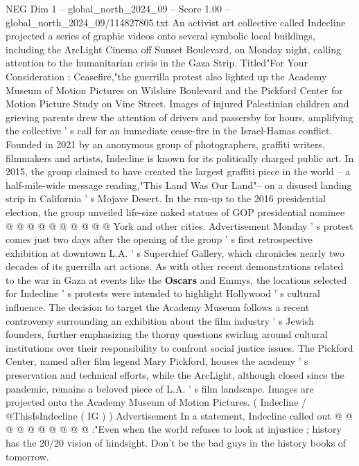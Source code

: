 \begin{textsample}{NEG Dim 1 – global\_north\_2024\_09 – Score 1.00 – global\_north\_2024\_09/114827805.txt}  \label{ex:f1_neg_360}
An activist art collective called Indecline projected a series of graphic videos onto several symbolic local buildings, including the ArcLight Cinema off Sunset Boulevard, on Monday night, calling attention to the humanitarian crisis in the Gaza Strip.
Titled"For Your Consideration : Ceasefire,"the guerrilla protest also lighted up the Academy Museum of Motion Pictures on Wilshire Boulevard and the Pickford Center for Motion Picture Study on Vine Street.
Images of injured Palestinian children and grieving parents drew the attention of drivers and passersby for hours, amplifying the collective ' s call for an immediate cease-fire in the Israel-Hamas conflict.
Founded in 2021 by an anonymous group of photographers, graffiti writers, filmmakers and artists, Indecline is known for its politically charged public art.
In 2015, the group claimed to have created the largest graffiti piece in the world -- a half-mile-wide message reading,"This Land Was Our Land"-- on a disused landing strip in California ' s Mojave Desert.
In the run-up to the 2016 presidential election, the group unveiled life-size naked statues of GOP presidential nominee @ @ @ @ @ @ @ @ @ @ York and other cities.
Advertisement Monday ' s protest comes just two days after the opening of the group ' s first retrospective exhibition at downtown L.A. ' s Superchief Gallery, which chronicles nearly two decades of its guerrilla art actions.
As with other recent demonstrations related to the war in Gaza at events like the \textbf{Oscars} and Emmys, the locations selected for Indecline ' s protests were intended to highlight Hollywood ' s cultural influence.
The decision to target the Academy Museum follows a recent controversy surrounding an exhibition about the film industry ' s Jewish founders, further emphasizing the thorny questions swirling around cultural institutions over their responsibility to confront social justice issues.
The Pickford Center, named after film legend Mary Pickford, houses the academy ' s preservation and technical efforts, while the ArcLight, although closed since the pandemic, remains a beloved piece of L.A. ' s film landscape.
Images are projected onto the Academy Museum of Motion Pictures. ( Indecline / @ThisIsIndecline ( IG ) ) Advertisement In a statement, Indecline called out @ @ @ @ @ @ @ @ @ @ :"Even when the world refuses to look at injustice ; history has the 20/20 vision of hindsight.
Don't be the bad guys in the history books of tomorrow.

\end{textsample}
